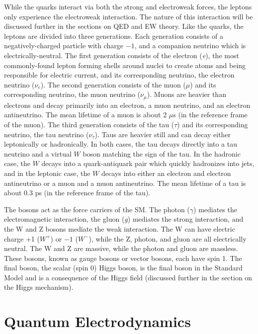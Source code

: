While the quarks interact via both the strong and electroweak forces, the leptons only experience the electroweak interaction. The nature of this interaction will be discussed further in the sections on QED and EW theory. Like the quarks, the leptons are divided into three generations. Each generation consists of a negatively-charged particle with charge $-1$, and a companion neutrino which is electrically-neutral. The first generation consists of the electron (\textit{e}), the most commonly-found lepton forming shells around nuclei to create atoms and being responsible for electric current, and its corresponding neutrino, the electron neutrino (\textit{$\nu_{e}$}). The second generation consists of the muon (\textit{$\mu$}) and its corresponding neutrino, the muon neutrino (\textit{$\nu_{\mu}$}). Muons are heavier than electrons and decay primarily into an electron, a muon neutrino, and an electron antineutrino. The mean lifetime of a muon is about 2 $\mu$s (in the reference frame of the muon). The third generation consists of the tau (\textit{$\tau$}) and its corresponding neutrino, the tau neutrino (\textit{$\nu_{\tau}$}). Taus are heavier still and can decay either leptonically or hadronically. In both cases, the tau decays directly into a tau neutrino and a virtual $W$ boson matching the sign of the tau. In the hadronic case, the $W$ decays into a quark-antiquark pair which quickly hadronizes into jets, and in the leptonic case, the $W$ decays into either an electron and electron antineutrino or a muon and a muon antineutrino.  The mean lifetime of a tau is about $0.3$ ps (in the reference frame of the tau)\cite{pdg}.

The bosons act as the force carriers of the SM. The photon (\textit{$\gamma$}) mediates the electromagnetic interaction, the gluon (\textit{g}) mediates the strong interaction, and the W and Z bosons mediate the weak interaction. The W can have electric charge +1 (\textit{$W^{+}$}) or $-1$ (\textit{$W^{-}$}), while the Z, photon, and gluon are all electrically neutral. The W and Z are massive, while the photon and gluon are massless. These bosons, known as gauge bosons or vector bosons, each have spin 1. The final boson, the scalar (spin 0) Higgs boson, is the final boson in the Standard Model and is a consequence of the Higgs field (discussed further in the section on the Higgs mechanism).

\section{Quantum Electrodynamics}

